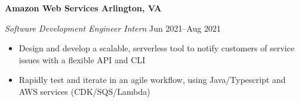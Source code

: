\textbf{Amazon Web Services \hfill Arlington, VA}\par

\textit{Software Development Engineer Intern} \hfill Jun 2021--Aug 2021
\begin{itemize}
	\item Design and develop a scalable, serverless tool to notify customers of service issues with a flexible API and CLI
	\item Rapidly test and iterate in an agile workflow, using Java/Typescript and AWS services (CDK/SQS/Lambda)
\end{itemize}\par